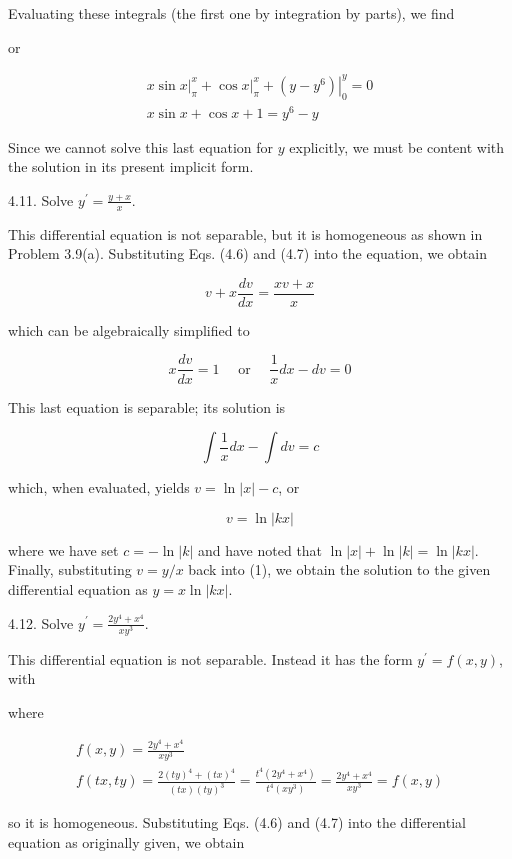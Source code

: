 \documentclass[10pt]{article}
\begin{document}
Evaluating these integrals (the first one by integration by parts), we find

or

$$
\begin{gathered}
\left.x \sin x\right|_{\pi} ^{x}+\left.\cos x\right|_{\pi} ^{x}+\left.\left(y-y^{6}\right)\right|_{0} ^{y}=0 \\
x \sin x+\cos x+1=y^{6}-y
\end{gathered}
$$

Since we cannot solve this last equation for $y$ explicitly, we must be content with the solution in its present implicit form.

4.11. Solve $y^{\prime}=\frac{y+x}{x}$.

This differential equation is not separable, but it is homogeneous as shown in Problem 3.9(a). Substituting Eqs. (4.6) and (4.7) into the equation, we obtain

$$
v+x \frac{d v}{d x}=\frac{x v+x}{x}
$$

which can be algebraically simplified to

$$
x \frac{d v}{d x}=1 \quad \text { or } \quad \frac{1}{x} d x-d v=0
$$

This last equation is separable; its solution is

$$
\int \frac{1}{x} d x-\int d v=c
$$

which, when evaluated, yields $v=\ln |x|-c$, or


\begin{equation*}
v=\ln |k x| \tag{1}
\end{equation*}


where we have set $c=-\ln |k|$ and have noted that $\ln |x|+\ln |k|=\ln |k x|$. Finally, substituting $v=y / x$ back into (1), we obtain the solution to the given differential equation as $y=x \ln |k x|$.

4.12. Solve $y^{\prime}=\frac{2 y^{4}+x^{4}}{x y^{3}}$.

This differential equation is not separable. Instead it has the form $y^{\prime}=f(x, y)$, with

where

$$
\begin{gathered}
f(x, y)=\frac{2 y^{4}+x^{4}}{x y^{3}} \\
f(t x, t y)=\frac{2(t y)^{4}+(t x)^{4}}{(t x)(t y)^{3}}=\frac{t^{4}\left(2 y^{4}+x^{4}\right)}{t^{4}\left(x y^{3}\right)}=\frac{2 y^{4}+x^{4}}{x y^{3}}=f(x, y)
\end{gathered}
$$

so it is homogeneous. Substituting Eqs. (4.6) and (4.7) into the differential equation as originally given, we obtain
\end{document}
